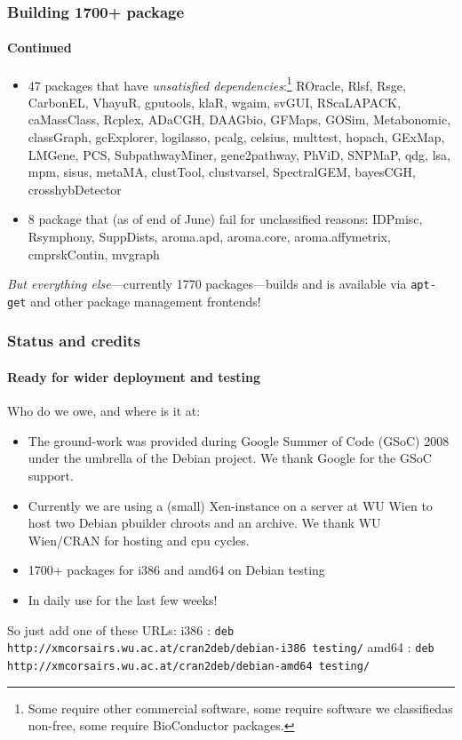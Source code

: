 \documentclass[smaller,compress]{beamer}
\begin{document}
\begin{frame}
  \frametitle{Building 1700+ package}
  \framesubtitle{Continued}

  \begin{itemize}
  \item 47 packages that have \textsl{unsatisfied
      dependencies}:\footnote{Some require other commercial software, some
      require software we classified\newline as non-free, some require BioConductor packages.}
    ROracle, Rlsf, Rsge, CarbonEL, VhayuR, gputools, klaR, wgaim, svGUI,
    RScaLAPACK, caMassClass, Rcplex, ADaCGH, DAAGbio, GFMaps, GOSim,
    Metabonomic, classGraph, gcExplorer, logilasso, pcalg, celsius, multtest,
    hopach, GExMap, LMGene, PCS, SubpathwayMiner, gene2pathway, PhViD,
    SNPMaP, qdg, lsa, mpm, sisus, metaMA, clustTool, clustvarsel,
    SpectralGEM, bayesCGH, crosshybDetector  
  \item 8 package that (as of end of June) fail for unclassified reasons:
    IDPmisc, Rsymphony, SuppDists, aroma.apd, aroma.core, aroma.affymetrix, cmprskContin, mvgraph
  \end{itemize}

  \MedSkip
  \textsl{But everything else}---currently 1770 packages---builds and is
  available via \texttt{apt-get} and other package management frontends!
\end{frame}  

\begin{frame}
  \frametitle{Status and credits}
  \framesubtitle{Ready for wider deployment and testing}

  Who do we owe, and where is it at: 

  \begin{itemize}
  \item The ground-work was provided during Google Summer of Code (GSoC) 2008 under the
    umbrella of the Debian project. We thank Google for the GSoC support.
  \item Currently we are using a (small) Xen-instance on a server at WU Wien to host
    two Debian pbuilder chroots and an archive. We thank WU Wien/CRAN for
    hosting and cpu cycles.
  \item 1700+ packages for i386 and amd64 on Debian testing
  \item In daily use for the last few weeks!
  \end{itemize}

  \MedSkip
  So just add one of these URLs:\newline
  i386 \phantom{xx} : { \SmallSkip \scriptsize
    \texttt{deb http://xmcorsairs.wu.ac.at/cran2deb/debian-i386 testing/}
  } \newline
  amd64 : { \SmallSkip \scriptsize
    \texttt{deb http://xmcorsairs.wu.ac.at/cran2deb/debian-amd64 testing/}
  }

\end{frame}
\end{document}
